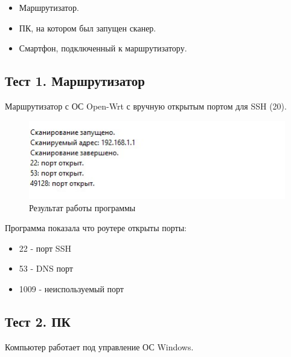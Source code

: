\begin{itemize}
\item
  Маршрутизатор.
\item
  ПК, на котором был запущен сканер.
\item
  Смартфон, подключенный к маршрутизатору.
\end{itemize}

\hypertarget{ux442ux435ux441ux442-1.-ux43cux430ux440ux448ux440ux443ux442ux438ux437ux430ux442ux43eux440}{%
\subsection{Тест 1.
Маршрутизатор}\label{ux442ux435ux441ux442-1.-ux43cux430ux440ux448ux440ux443ux442ux438ux437ux430ux442ux43eux440}}

Маршрутизатор с ОС Open-Wrt с вручную открытым портом для SSH (20).

\begin{figure}
\centering
\includegraphics{./files/screenshot2.png}
\caption{Результат работы программы}
\end{figure}

Программа показала что роутере открыты порты:

\begin{itemize}
\item
  22 - порт SSH
\item
  53 - DNS порт
\item
  1009 - неиспользуемый порт
\end{itemize}

\hypertarget{ux442ux435ux441ux442-2.-ux43fux43a}{%
\subsection{Тест 2. ПК}\label{ux442ux435ux441ux442-2.-ux43fux43a}}

Компьютер работает под управление ОС Windows.

